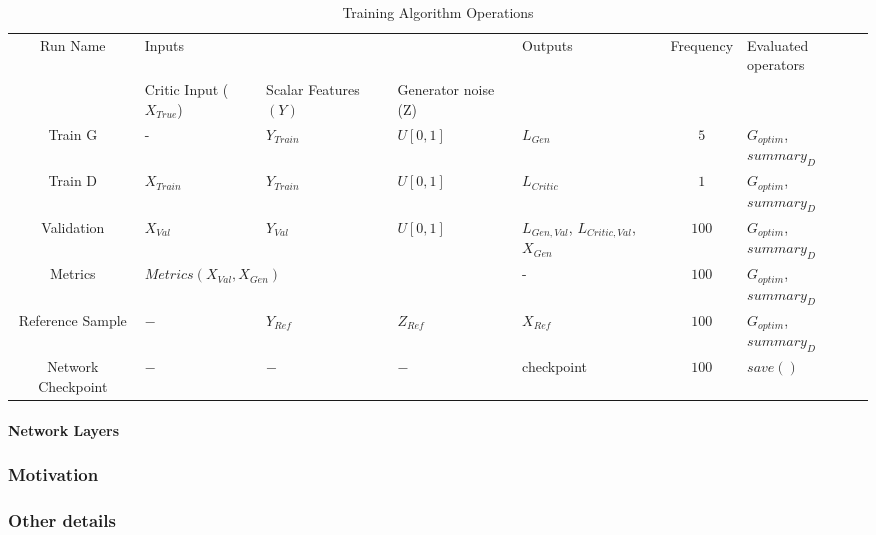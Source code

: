 \begin{table}[h!]
	\centering
	\begin{tabularx}{\textwidth}{| c | X | X | X | X | c | X | }
		\hline
		Run Name & \multicolumn{3}{X|}{Inputs} & Outputs & Frequency & Evaluated operators \\ \cline{2-4}
		  & Critic Input ($X_{True}$) & Scalar Features $(Y)$ & Generator noise (Z) &   &   &   \\
		\hline
		Train G & - & $Y_{Train}$ & $U[0,1]$ & $L_{Gen}$ & $5$ & $G_{optim}$, $summary_D$ \\ \hline
		Train D & $X_{Train}$ & $Y_{Train}$ & $U[0,1]$ & $L_{Critic}$ & $1$ & $G_{optim}$, $summary_D$\\ \hline
		Validation & $X_{Val}$ & $Y_{Val}$ & $U[0,1]$ &  $L_{Gen, Val}$, $L_{Critic, Val}$, $X_{Gen}$ & $100$ & $G_{optim}$, $summary_D$ \\ \hline
		Metrics & \multicolumn{3}{X|}{$Metrics(X_{Val}, X_{Gen})$} &  - & $100$ & $G_{optim}$, $summary_D$ \\ \hline
		Reference Sample & $-$ & $Y_{Ref}$ & $Z_{Ref}$ &  $X_{Ref}$ & $100$ & $G_{optim}$, $summary_D$ \\ \hline
		Network Checkpoint & $-$ & $-$ & $-$  & checkpoint & $100$ & $save()$ \\ \hline
	\end{tabularx}
	\caption{Training Algorithm Operations}
	\label{tab:training}
\end{table}

\paragraph{Network Layers}

\subsubsection{Motivation} %
\label{sec:arch_advantages}





\subsubsection{Other details} %


